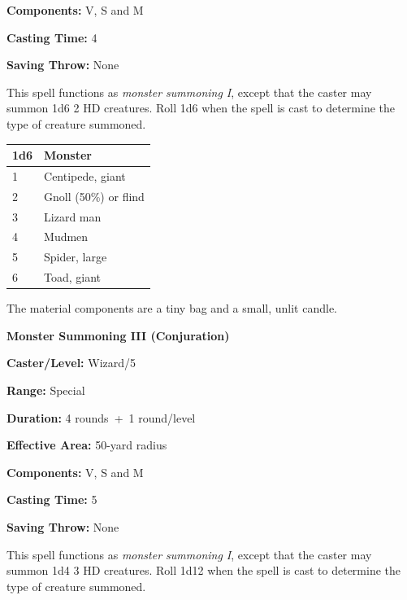 \begin{multicols}{2}
\begin{minipage}{\columnwidth}
\noindent \textbf{Components:} V, S and M

\noindent \textbf{Casting Time:} 4

\noindent \textbf{Saving Throw:} None

\end{minipage}

This spell functions as \textit{monster summoning I}, except that the caster may summon 1d6 2 HD creatures.  Roll 1d6 when the spell is cast to determine the type of creature summoned.
 
\noindent
\begin{tabular}{|p{}|p{}|}
\hline
1d6	& Monster \\
\hline\hline
\rowcolor[gray]{.9}1	& Centipede, giant \\
2	& Gnoll (50\%) or flind \\
\rowcolor[gray]{.9}3	& Lizard man \\
4	& Mudmen \\
\rowcolor[gray]{.9}5	& Spider, large \\
6	& Toad, giant \\
\hline
\end{tabular}

The material components are a tiny bag and a small, unlit candle.

\vspace{1em}

\noindent
\begin{minipage}{\columnwidth}

\noindent \textbf{Monster Summoning III (Conjuration)}

\noindent \textbf{Caster/Level:} Wizard/5

\noindent \textbf{Range:} Special

\noindent \textbf{Duration:} 4 rounds~+~1 round/level

\noindent \textbf{Effective Area:} 50-yard radius

\noindent \textbf{Components:} V, S and M

\noindent \textbf{Casting Time:} 5

\noindent \textbf{Saving Throw:} None

\end{minipage}

This spell functions as \textit{monster summoning I}, except that the caster may summon 1d4 3 HD creatures.  Roll 1d12 when the spell is cast to determine the type of creature summoned.


\end{multicols}
